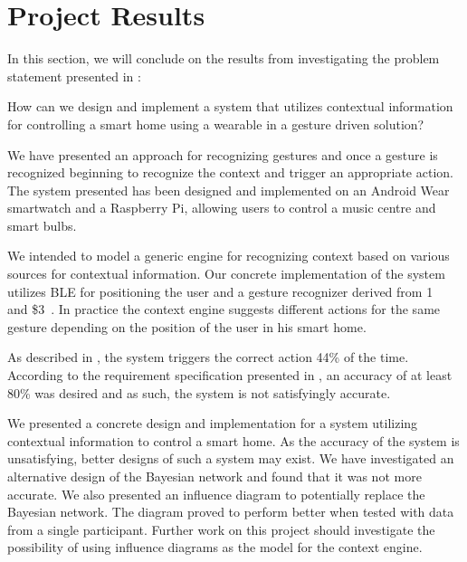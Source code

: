 \section{Project Results}
\label{sec:results}

In this section, we will conclude on the results from investigating the problem statement presented in :

\begin{framed}
\noindent How can we design and implement a system that utilizes contextual information for controlling a smart home using a wearable in a gesture driven solution?
\end{framed}

We have presented an approach for recognizing gestures and once a gesture is recognized beginning to recognize the context and trigger an appropriate action. The system presented has been designed and implemented on an Android Wear smartwatch and a Raspberry Pi, allowing users to control a music centre and smart bulbs.

We intended to model a generic engine for recognizing context based on various sources for contextual information. Our concrete implementation of the system utilizes BLE for positioning the user and a gesture recognizer derived from 1\textcent~\cite{herold20121} and \$3~\cite{threedollar}. In practice the context engine suggests different actions for the same gesture depending on the position of the user in his smart home.

As described in , the system triggers the correct action 44\% of the time. According to the requirement specification presented in , an accuracy of at least 80\% was desired and as such, the system is not satisfyingly accurate.

We presented a concrete design and implementation for a system utilizing contextual information to control a smart home. As the accuracy of the system is unsatisfying, better designs of such a system may exist. We have investigated an alternative design of the Bayesian network and found that it was not more accurate.
We also presented an influence diagram to potentially replace the Bayesian network. The diagram proved to perform better when tested with data from a single participant.
Further work on this project should investigate the possibility of using influence diagrams as the model for the context engine.

